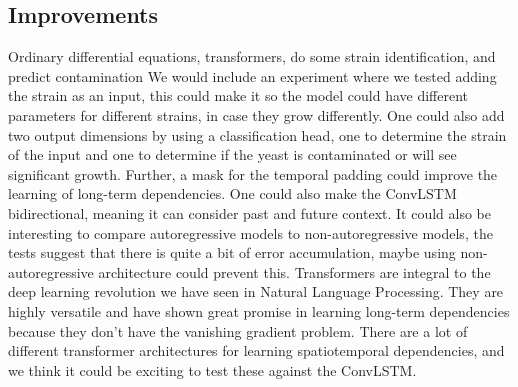 \documentclass[a4paper,12pt]{article}
\begin{document}
\subsection{Improvements}
Ordinary differential equations, transformers, do some strain identification, and predict contamination
We would include an experiment where we tested adding the strain as an input, this could make it so the model could have different parameters for different strains, in case they grow differently. One could also add two output dimensions by using a classification head, one to determine the strain of the input and one to determine if the yeast is contaminated or will see significant growth.
Further, a mask for the temporal padding could improve the learning of long-term dependencies. One could also make the ConvLSTM bidirectional, meaning it can consider past and future context. It could also be interesting to compare autoregressive models to non-autoregressive models, the tests suggest that there is quite a bit of error accumulation, maybe using non-autoregressive architecture could prevent this.
Transformers are integral to the deep learning revolution we have seen in Natural Language Processing. They are highly versatile and have shown great promise in learning long-term dependencies because they don't have the vanishing gradient problem. There are a lot of different transformer architectures for learning spatiotemporal dependencies, and we think it could be exciting to test these against the ConvLSTM.
\end{document}
